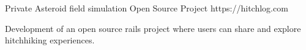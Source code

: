 

\begin{cventries}

  \cventry
    {Private}
    {Asteroid field simulation} %
    {Open Source Project} %
    {https://hitchlog.com} %
    {
      \begin{cvitems} %
        \item Development of an open source rails project where users can share and explore hitchhiking experiences.
      \end{cvitems}
    }

\end{cventries}
